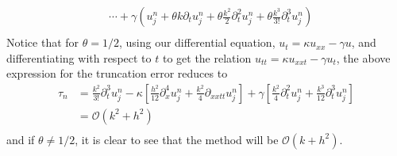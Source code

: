 \documentclass{article}
\begin{document}
\begin{itemize}
\begin{align*}
        &\cdots + \gamma\left(u_j^n + \theta k\partial_tu_j^n + \theta\frac{k^2}{2}\partial_t^2u_j^n + \theta\frac{k^3}{3!}\partial_t^3u_j^n\right) \\
    \end{align*}
    Notice that for $\theta = 1/2$, using our differential equation, $u_t = \kappa u_{xx} - \gamma u$, and differentiating with respect to $t$ to get the relation $u_{tt} = \kappa u_{xxt} - \gamma u_t$, the above expression for the truncation error reduces to
    \begin{align*}
        \tau_n &= \frac{k^2}{3!}\partial_t^3u_j^n - \kappa\left[\frac{h^2}{12}\partial_x^4u_j^n + \frac{k^2}{4}\partial_{xxtt}u_j^n\right] + \gamma\left[\frac{k^2}{4}\partial_t^2u_j^n + \frac{k^3}{12}\partial_t^3u_j^n\right] \\
        &= \mathcal{O}(k^2 + h^2) \\
    \end{align*}
    and if $\theta \neq 1/2$, it is clear to see that the method will be $\mathcal{O}(k + h^2)$.


\end{itemize}
\end{document}

